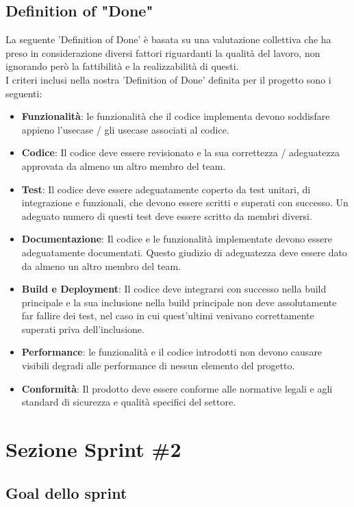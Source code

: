 \documentclass{article}
\begin{document}
\subsection{Definition of "Done"}
La seguente 'Definition of Done' è basata su una valutazione collettiva che ha preso in considerazione  diversi fattori riguardanti la qualità del lavoro, non ignorando però la fattibilità e la realizzabilità di questi.\\
I criteri inclusi nella nostra 'Definition of Done' definita per il progetto sono i seguenti:
\begin{itemize}
	\item \textbf{Funzionalità}: le funzionalità che il codice implementa devono soddisfare appieno l'usecase / gli usecase associati al codice.
    \item \textbf{Codice}: Il codice deve essere revisionato e la sua correttezza / adeguatezza approvata da almeno un altro membro del team.
    \item \textbf{Test}: Il codice deve essere adeguatamente coperto da test unitari, di integrazione e funzionali, che devono essere scritti e superati con successo. Un adeguato numero di questi test deve essere scritto da membri diversi.
    \item \textbf{Documentazione}: Il codice e le funzionalità implementate devono essere adeguatamente documentati. Questo giudizio di adeguatezza deve essere dato da almeno un altro membro del team.
    \item \textbf{Build e Deployment}: Il codice deve integrarsi con successo nella build principale e la sua inclusione nella build principale non deve assolutamente far fallire dei test, nel caso in cui quest'ultimi venivano correttamente superati priva dell'inclusione.
    \item \textbf{Performance}: le funzionalità e il codice introdotti non devono causare visibili degradi alle performance di nessun elemento del progetto.
    \item \textbf{Conformità}: Il prodotto deve essere conforme alle normative legali e agli standard di sicurezza e qualità specifici del settore.
\end{itemize}

\clearpage

\section{Sezione Sprint \#2}

\subsection{Goal dello sprint}
\end{document}
